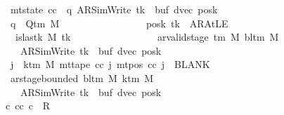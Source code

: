 \begin{isabellebody}
\ \ \ \ \ \ \ \ \ \ \ \ \ \ \ \ \ mt{\isacharunderscore}{\kern0pt}state\ cc\ {\isacharequal}{\kern0pt}\ {\isacharparenleft}{\kern0pt}q{\isacharcomma}{\kern0pt}\ AR{\isacharunderscore}{\kern0pt}SimWrite{\isacharcomma}{\kern0pt}\ tk{\isacharcomma}{\kern0pt}\ {}{\isacharcomma}{\kern0pt}\ buf{\isacharcomma}{\kern0pt}\ dvec{\isacharcomma}{\kern0pt}\ posk{\isacharparenright}{\kern0pt}{\isacharsemicolon}{\kern0pt}\isanewline
\ \ \ \ \ \ \ \ \ \ \ \ \ \ \ \ \ q\ {\isasymin}\ Q{\isacharunderscore}{\kern0pt}tm\ M{\isacharsemicolon}{\kern0pt}\isanewline
\ \ \ \ \ \ \ \ \ \ \ \ \ \ \ \ \ posk\ tk\ {\isacharequal}{\kern0pt}\ AR{\isacharunderscore}{\kern0pt}AtLE{\isacharsemicolon}{\kern0pt}\isanewline
\ \ \ \ \ \ \ \ \ \ \ \ \ \ \ \ \ {\isasymnot}\ is{\isacharunderscore}{\kern0pt}last{\isacharunderscore}{\kern0pt}k\ M\ tk{\isacharsemicolon}{\kern0pt}\isanewline
\ \ \ \ \ \ \ \ \ \ \ \ \ \ \ \ \ ar{\isacharunderscore}{\kern0pt}valid{\isacharunderscore}{\kern0pt}stage\ {\isacharparenleft}{\kern0pt}{\isasymGamma}{\isacharunderscore}{\kern0pt}tm\ M{\isacharparenright}{\kern0pt}\ {\isacharparenleft}{\kern0pt}bl{\isacharunderscore}{\kern0pt}tm\ M{\isacharparenright}{\kern0pt}\isanewline
\ \ \ \ \ \ \ \ \ \ \ \ \ \ \ \ \ \ \ {\isacharparenleft}{\kern0pt}AR{\isacharunderscore}{\kern0pt}SimWrite{\isacharcomma}{\kern0pt}\ tk{\isacharcomma}{\kern0pt}\ {}{\isacharcomma}{\kern0pt}\ buf{\isacharcomma}{\kern0pt}\ dvec{\isacharcomma}{\kern0pt}\ posk{\isacharparenright}{\kern0pt}{\isacharsemicolon}{\kern0pt}\isanewline
\ \ \ \ \ \ \ \ \ \ \ \ \ \ \ \ \ {\isasymforall}j\ {\isasymge}\ k{\isacharunderscore}{\kern0pt}tm\ M{\isachardot}{\kern0pt}\ mt{\isacharunderscore}{\kern0pt}tape\ cc\ j\ {\isacharparenleft}{\kern0pt}mt{\isacharunderscore}{\kern0pt}pos\ cc\ j{\isacharparenright}{\kern0pt}\ {\isacharequal}{\kern0pt}\ BLANK{}{\isacharsemicolon}{\kern0pt}\isanewline
\ \ \ \ \ \ \ \ \ \ \ \ \ \ \ \ \ ar{\isacharunderscore}{\kern0pt}stage{\isacharunderscore}{\kern0pt}bounded\ {\isacharparenleft}{\kern0pt}bl{\isacharunderscore}{\kern0pt}tm\ M{\isacharparenright}{\kern0pt}\ {\isacharparenleft}{\kern0pt}k{\isacharunderscore}{\kern0pt}tm\ M{\isacharparenright}{\kern0pt}\isanewline
\ \ \ \ \ \ \ \ \ \ \ \ \ \ \ \ \ \ \ {\isacharparenleft}{\kern0pt}AR{\isacharunderscore}{\kern0pt}SimWrite{\isacharcomma}{\kern0pt}\ tk{\isacharcomma}{\kern0pt}\ {}{\isacharcomma}{\kern0pt}\ buf{\isacharcomma}{\kern0pt}\ dvec{\isacharcomma}{\kern0pt}\ posk{\isacharparenright}{\kern0pt}\ {\isasymrbrakk}\isanewline
\ \ \ \ \ \ \ \ \ \ \ \ \ \ \ {\isasymLongrightarrow}\ {\isasymexists}c{\isacharprime}{\kern0pt}{\isacharprime}{\kern0pt}{\isachardot}{\kern0pt}\ {\isacharparenleft}{\kern0pt}cc{\isacharcomma}{\kern0pt}\ c{\isacharprime}{\kern0pt}{\isacharprime}{\kern0pt}{\isacharparenright}{\kern0pt}\ {\isasymin}\ R{\isacharprime}{\kern0pt}\isanewline

\end{isabellebody}
